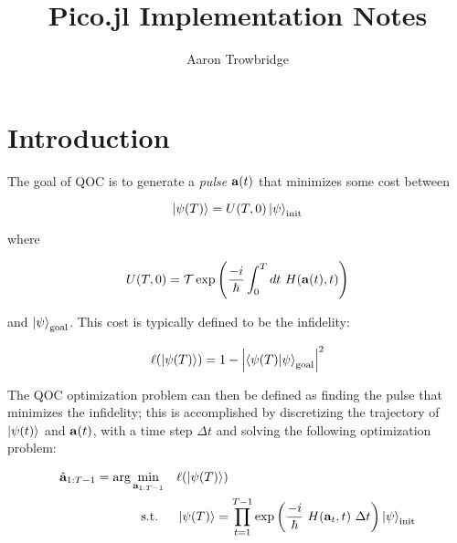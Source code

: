 \documentclass{article}
\title{Pico.jl Implementation Notes}
\author{Aaron Trowbridge}
\date{}
\begin{document}
\maketitle



\tableofcontents

\newpage


\section{Introduction}

The goal of QOC is to generate a \textit{pulse} $\vb{a}(t)$ that minimizes some cost between 

\begin{equation} 
  \ket{\psi(T)} = U(T, 0) \ket{\psi}_{\text{init}}
\end{equation}

where

\begin{equation}
  U(T, 0) = \mathcal{T} \exp \qty( \frac{-i}{\hbar} \int_0^T dt \ H(\vb{a}(t), t)) 
\end{equation}

and $\ket{\psi}_{\text{goal}}$. This cost is typically defined to be the infidelity:

\begin{equation}
  \ell \qty(\ket{\psi(T)}) = 1 - \abs{\bra{\psi(T)} \ket{\psi}_{\text{goal}}}^2
\end{equation}

The QOC optimization problem can then be defined as finding the pulse that minimizes the infidelity; this is accomplished by discretizing the trajectory of $\ket{\psi(t)}$ and $\vb{a}(t)$, with a time step $\Delta t$ and solving the following optimization problem:

\begin{align*}
  \hat{\vb{a}}_{1:T-1} = \arg \min_{\vb{a}_{1:T-1}} \quad &\ell \qty(\ket{\psi(T)})\\
  \text{s.t. } \quad 
    & \ket{\psi(T)} = \prod_{t=1}^{T-1} \exp \qty( \frac{-i}{\hbar} \ H(\vb{a}_t, t) \ \Delta t) \ket{\psi}_{\text{init}} \\
\end{align*}
\end{document}
